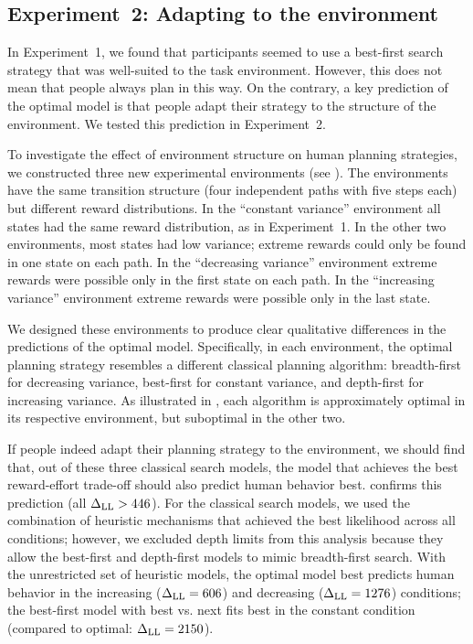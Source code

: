 \subsection{Experiment~2: Adapting to the environment}\label{sec:planning-results2}
In Experiment~1, we found that participants seemed to use a best-first search strategy that was well-suited to the task environment. However, this does not mean that people always plan in this way. 
On the contrary, a key prediction of the optimal model is that people adapt their strategy to the structure of the environment. We tested this prediction in Experiment~2.

To investigate the effect of environment structure on human planning strategies, we constructed three new experimental environments (see ). The environments have the same transition structure (four independent paths with five steps each) but different reward distributions. In the ``constant variance'' environment all states had the same reward distribution, as in Experiment~1. In the other two environments, most states had low variance; extreme rewards could only be found in one state on each path. In the ``decreasing variance'' environment extreme rewards were possible only in the first state on each path. In the ``increasing variance'' environment extreme rewards were possible only in the last state.

We designed these environments to produce clear qualitative differences in the predictions of the optimal model. Specifically, in each environment, the optimal planning strategy resembles a different classical planning algorithm: breadth-first for decreasing variance, best-first for constant variance, and depth-first for increasing variance. As illustrated in , each algorithm is approximately optimal in its respective environment, but suboptimal in the other two.

If people indeed adapt their planning strategy to the environment, we should find that, out of these three classical search models, the model that achieves the best reward-effort trade-off should also predict human behavior best.  confirms this prediction (all $\Delta_{\mathrm{LL}} > 446$). For the classical search models, we used the combination of heuristic mechanisms that achieved the best likelihood across all conditions; however, we excluded depth limits from this analysis because they allow the best-first and depth-first models to mimic breadth-first search. With the unrestricted set of heuristic models, the optimal model best predicts human behavior in the increasing ($\Delta_{\mathrm{LL}} = 606$) and decreasing ($\Delta_{\mathrm{LL}} = 1276$) conditions; the best-first model with best vs. next fits best in the constant condition (compared to optimal: $\Delta_{\mathrm{LL}} = 2150$).

